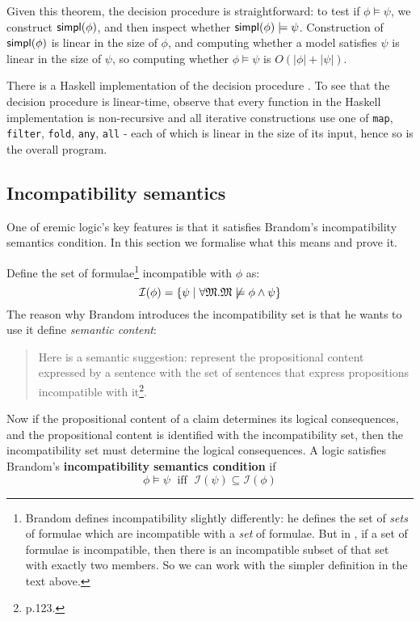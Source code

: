 Given this theorem, the decision procedure is straightforward: to
test if $\phi \models \psi$, we construct $\mathsf{simpl}(\phi)$, and then inspect whether
$\mathsf{simpl}(\phi) \models \psi$.  Construction of $\mathsf{simpl}(\phi)$ is linear in the size of
$\phi$, and computing whether a model satisfies $\psi$ is linear in the size
of $\psi$, so computing whether $\phi \models \psi$ is $O(|\phi|+|\psi|)$.

There is a Haskell implementation of the decision procedure
\cite{HaskellImplementation}.  To see that the decision procedure is
linear-time, observe that every function in the Haskell implementation
is non-recursive and all iterative constructions use one of
\texttt{map}, \texttt{filter}, \texttt{fold}, \texttt{any},
\texttt{all} - each of which is linear in the size of its input, hence
so is the overall program.



\subsection{Incompatibility semantics}\label{incompatibility}

\NI One of eremic logic's key features is that it satisfies Brandom's
incompatibility semantics condition. In this section we formalise what
this means and prove it.

Define the set of formulae\footnote{Brandom \cite{brandom} defines
  incompatibility slightly differently: he defines the set of
  \emph{sets} of formulae which are incompatible with a \emph{set} of
  formulae.  But in \ELABR{}, if a set of formulae is incompatible,
  then there is an incompatible subset of that set with exactly two
  members.  So we can work with the simpler definition in the text
  above.}  incompatible with $\phi$ as:
\[
\mathcal{I}(\phi) = \{
  \psi \; | \; \forall \frak{M}. \frak{M} \not \models \phi \land \psi\}
\]
The reason why Brandom introduces the incompatibility set is that he wants to use it define \emph{semantic content}:
\begin{quote}
Here is a semantic suggestion: represent the propositional content expressed by a sentence with the set of sentences that express propositions incompatible with it\footnote{\cite{brandom} p.123.}.
\end{quote}
Now if the propositional content of a claim determines its logical consequences, and the propositional content is identified with the incompatibility set, then the incompatibility set must determine the logical consequences.
A logic satisfies Brandom's \textbf{incompatibility semantics condition} if
\[
\phi \models \psi \; \mbox{ iff } \; \mathcal{I}(\psi) \subseteq \mathcal{I}(\phi)
\]

